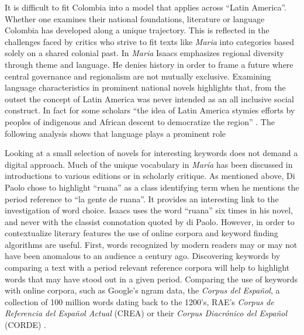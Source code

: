\documentclass[12pt]{report}
\begin{document}
It is difficult to fit Colombia into a model that applies across \enquote{Latin America}. Whether one examines their national foundations, literature or language Colombia has developed along a unique trajectory. This is reflected in the challenges faced by critics who strive to fit texts like \textit{Maria} into categories based solely on a shared colonial past. In \textit{Maria} Isaacs emphasizes regional diversity through theme and language. He denies history in order to frame a future where central governance and regionalism are not mutually exclusive. Examining language characteristics in prominent national novels highlights that, from the outset the concept of Latin America was never intended as an all inclusive social construct. In fact for some scholars \enquote{the idea of Latin America stymies efforts by peoples of indigenous and African descent to democratize the region} \autocite[1347]{Gobat2013}. The following analysis shows that language plays a prominent role 


Looking at a small selection of novels for interesting keywords does not demand a digital approach.
Much of the unique vocabulary in \textit{María} has been discussed in introductions to various editions or in scholarly critique.
As mentioned above, Di Paolo chose to highlight \enquote{ruana} as a class identifying term when he mentions the period reference to \enquote{la gente de ruana}. 
It provides an interesting link to the investigation of word choice.
Isaacs uses the word \enquote{ruana} six times in his novel, and never with the classist connotation quoted by di Paolo.
However, in order to contextualize literary features the use of online corpora and keyword finding algorithms are useful.
First, words recognized by modern readers may or may not have been anomalous to an audience a century ago.
Discovering keywords by comparing a text with a period relevant reference corpora will help to highlight words that may have stood out in a given period.
Comparing the use of keywords with online corpora, such as Google's ngram data, the \textit{Corpus del Español}, a collection of 100 million words dating back to the 1200's, RAE's \textit{Corpus de Referencia del Español Actual} (CREA) or their \textit{Corpus Diacrónico del Español} (CORDE) \autocite*{Crea} \autocite{Corde}.
\end{document}
